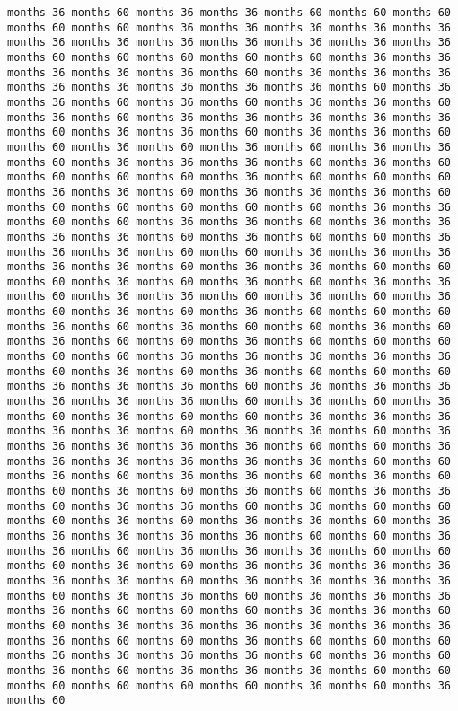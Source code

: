 \documentclass[11pt]{article}
\begin{document}
\begin{Verbatim}[commandchars=\\\{\}, frame=single, framerule=2mm, rulecolor=\color{outerrorbackground}]
months 36 months 60 months 36 months 36 months 60 months 60 months 60 months 60 months 60 months 36 months 36 months 36 months 36 months 36 months 36 months 36 months 36 months 36 months 36 months 36 months 36 months 60 months 60 months 60 months 60 months 60 months 36 months 36 months 36 months 36 months 36 months 60 months 36 months 36 months 36 months 36 months 36 months 36 months 36 months 36 months 60 months 36 months 36 months 60 months 36 months 60 months 36 months 36 months 60 months 36 months 60 months 36 months 36 months 36 months 36 months 36 months 60 months 36 months 36 months 60 months 36 months 36 months 60 months 60 months 36 months 60 months 36 months 60 months 36 months 36 months 60 months 36 months 36 months 36 months 60 months 36 months 60 months 60 months 60 months 60 months 36 months 60 months 60 months 60 months 36 months 36 months 60 months 36 months 36 months 36 months 60 months 60 months 60 months 60 months 60 months 60 months 36 months 36 months 60 months 60 months 36 months 36 months 60 months 36 months 36 months 36 months 36 months 60 months 36 months 60 months 60 months 36 months 36 months 36 months 60 months 60 months 36 months 36 months 36 months 36 months 36 months 60 months 36 months 36 months 60 months 60 months 60 months 36 months 60 months 36 months 60 months 36 months 36 months 60 months 36 months 36 months 60 months 36 months 60 months 36 months 60 months 36 months 60 months 36 months 60 months 60 months 60 months 36 months 60 months 36 months 60 months 60 months 36 months 60 months 36 months 60 months 60 months 36 months 60 months 60 months 60 months 60 months 60 months 36 months 36 months 36 months 36 months 36 months 60 months 36 months 60 months 36 months 60 months 60 months 60 months 36 months 36 months 36 months 60 months 36 months 36 months 36 months 36 months 36 months 36 months 60 months 36 months 60 months 36 months 60 months 36 months 60 months 60 months 36 months 36 months 36 months 36 months 36 months 60 months 36 months 36 months 60 months 36 months 36 months 36 months 36 months 36 months 60 months 60 months 36 months 36 months 36 months 36 months 36 months 36 months 60 months 60 months 36 months 60 months 36 months 36 months 60 months 36 months 60 months 60 months 36 months 60 months 36 months 60 months 36 months 36 months 60 months 36 months 36 months 60 months 36 months 60 months 60 months 60 months 36 months 60 months 36 months 36 months 60 months 36 months 36 months 36 months 36 months 36 months 60 months 60 months 36 months 36 months 60 months 36 months 36 months 36 months 60 months 60 months 60 months 36 months 60 months 36 months 36 months 36 months 36 months 36 months 36 months 60 months 36 months 36 months 36 months 36 months 60 months 36 months 36 months 60 months 36 months 36 months 36 months 36 months 60 months 60 months 60 months 36 months 36 months 60 months 60 months 36 months 36 months 36 months 36 months 36 months 36 months 36 months 60 months 60 months 36 months 60 months 60 months 60 months 36 months 36 months 36 months 36 months 60 months 36 months 60 months 36 months 60 months 36 months 36 months 36 months 60 months 60 months 60 months 60 months 60 months 60 months 36 months 60 months 36 months 60 
\end{Verbatim}
\end{document}
